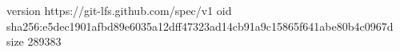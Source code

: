 version https://git-lfs.github.com/spec/v1
oid sha256:e5dec1901afbd89e6035a12dff47323ad14cb91a9c15865f641abe80b4c0967d
size 289383
